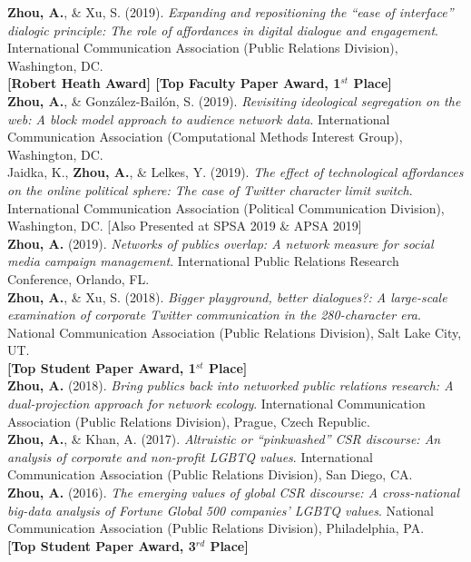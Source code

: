 \documentclass[12pt, letterpaper]{article}
\newcommand{\years}[1]{\marginnote{\normalsize #1}}
\begin{document}
{\years{[8]} \textbf{Zhou, A.}, \& Xu, S. (2019). \textit{Expanding and repositioning the ``ease of interface'' dialogic principle: The role of affordances in digital dialogue and engagement}. International Communication Association (Public Relations Division), Washington, DC.\\
\years{} \textbf{[Robert Heath Award] [Top Faculty Paper Award, 1$^{st}$ Place]}\\
\years{[7]} \textbf{Zhou, A.}, \& González-Bailón, S. (2019). \textit{Revisiting ideological segregation on the web: A block model approach to audience network data}. International Communication Association (Computational Methods Interest Group), Washington, DC.\\
\years{[6]} Jaidka, K., \textbf{Zhou, A.}, \& Lelkes, Y. (2019). \textit{The effect of technological affordances on the online political sphere: The case of Twitter character limit switch}. International Communication Association (Political Communication Division), Washington, DC. [Also Presented at SPSA 2019 \& APSA 2019]\\
\years{[5]} \textbf{Zhou, A.} (2019). \textit{Networks of publics overlap: A network measure for social media campaign management}. International Public Relations Research Conference, Orlando, FL.\\
\years{[4]} \textbf{Zhou, A.}, \& Xu, S. (2018). \textit{Bigger playground, better dialogues?: A large-scale examination of corporate Twitter communication in the 280-character era}. National Communication Association (Public Relations Division), Salt Lake City, UT.\\
\years{} \textbf{[Top Student Paper Award, 1$^{st}$ Place]}\\
\years{[3]} \textbf{Zhou, A.} (2018). \textit{Bring publics back into networked public relations research: A dual-projection approach for network ecology}. International Communication Association (Public Relations Division), Prague, Czech Republic.\\
\years{[2]} \textbf{Zhou, A.}, \& Khan, A. (2017). \textit{Altruistic or ``pinkwashed'' CSR discourse: An analysis of corporate and non-profit LGBTQ values}. International Communication Association (Public Relations Division), San Diego, CA.\\
\years{[1]} \textbf{Zhou, A.} (2016). \textit{The emerging values of global CSR discourse: A cross-national big-data analysis of Fortune Global 500 companies' LGBTQ values}. National Communication Association (Public Relations Division), Philadelphia, PA.\\
\years{} \textbf{[Top Student Paper Award, 3$^{rd}$ Place]}

}
\end{document}
